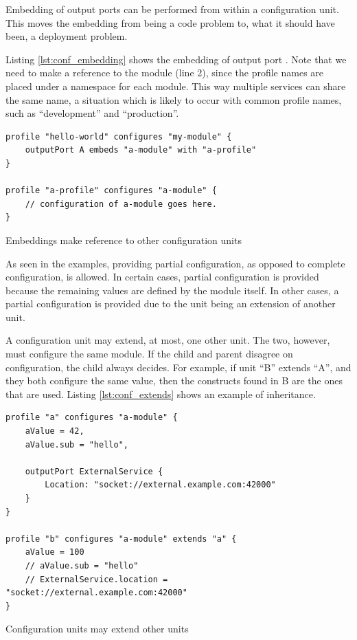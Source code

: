Embedding of output ports can be performed from within a configuration unit.
This moves the embedding from being a code problem to, what it should have
been, a deployment problem.

Listing \ref{lst:conf_embedding} shows the embedding of output port .
Note that we need to make a reference to the module (line 2), since the profile
names are placed under a namespace for each module. This way multiple services
can share the same name, a situation which is likely to occur with common
profile names, such as ``development'' and ``production''.

\begin{listing}[H]
\begin{verbatim}
profile "hello-world" configures "my-module" {
    outputPort A embeds "a-module" with "a-profile"
}

profile "a-profile" configures "a-module" {
    // configuration of a-module goes here.
}
\end{verbatim}
\caption{Embeddings make reference to other configuration units}
\label{lst:conf_embedding}
\end{listing}

As seen in the examples, providing partial configuration, as opposed to
complete configuration, is allowed. In certain cases, partial configuration is
provided because the remaining values are defined by the module itself. In
other cases, a partial configuration is provided due to the unit being an
extension of another unit.

A configuration unit may extend, at most, one other unit. The two, however,
  must configure the same module.  If the child and parent disagree on
  configuration, the child always decides.  For example, if unit ``B'' extends
  ``A'', and they both configure the same value, then the constructs found in B
  are the ones that are used. Listing \ref{lst:conf_extends} shows an example
  of inheritance.

\begin{listing}[H]
\begin{verbatim}
profile "a" configures "a-module" {
    aValue = 42,
    aValue.sub = "hello",

    outputPort ExternalService {
        Location: "socket://external.example.com:42000"
    }
}

profile "b" configures "a-module" extends "a" {
    aValue = 100
    // aValue.sub = "hello"
    // ExternalService.location = "socket://external.example.com:42000"
}
\end{verbatim}
\caption{Configuration units may extend other units}
\label{lst:conf_extends}
\end{listing}

